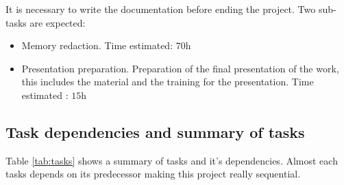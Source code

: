 \justify
It is necessary to write the documentation before ending the project. Two sub-tasks are expected:
\begin{itemize}
  \item Memory redaction. Time estimated: $\si{70\hour}$
  \item Presentation preparation. Preparation of the final presentation of the work, this includes the material and the training for the presentation. Time estimated : $\si{15\hour}$
\end{itemize}

\subsection{Task dependencies and summary of tasks}

\justify
Table \ref{tab:tasks} shows a summary of tasks and it's dependencies. Almost each tasks depends on its predecessor making this project really sequential.

